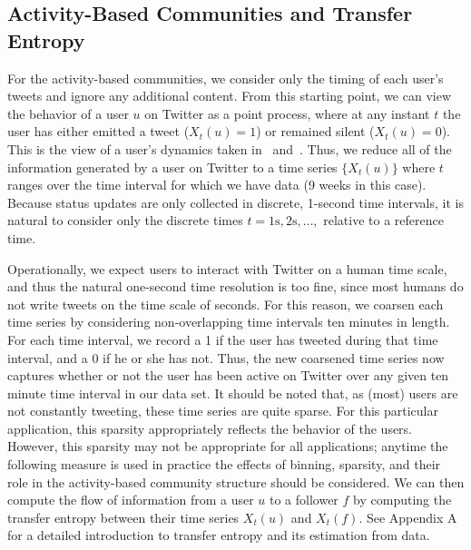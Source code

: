 \documentclass[10pt,letterpaper]{article}
\begin{document}
\subsection{Activity-Based Communities and Transfer Entropy}
\label{sec:method-activity}






For the activity-based communities, we consider only the timing of each user's tweets and ignore any additional content. From this starting point, we can view the behavior of a user $u$ on Twitter as a point process, where at any instant $t$ the user has either emitted a tweet ($X_{t}(u) = 1$) or remained silent ($X_{t}(u) = 0$). This is the view of a user's dynamics taken in~\cite{darmon2013understanding} and~\cite{ver2012information}. Thus, we reduce all of the information generated by a user on Twitter to a time series $\{ X_{t}(u)\}$ where $t$ ranges over the time interval for which we have data (9 weeks in this case). Because status updates are only collected in discrete, 1-second time intervals, it is natural to consider only the discrete times $t = 1 \text{s}, 2 \text{s}, \ldots, $ relative to a reference time. 

Operationally, we expect users to interact with Twitter on a human time scale, and thus the natural one-second time resolution is too fine, since most humans do not write tweets on the time scale of seconds. For this reason, we coarsen each time series by considering non-overlapping time intervals ten minutes in length. For each time interval, we record a 1 if the user has tweeted during that time interval, and a 0 if he or she has not. Thus, the new coarsened time series now captures whether or not the user has been active on Twitter over any given ten minute time interval in our data set. It should be noted that, as (most) users are not constantly tweeting, these time series are quite sparse. For this particular application, this sparsity appropriately reflects the behavior of the users. However, this sparsity may not be appropriate for all applications; anytime the following measure is used in practice the effects of binning, sparsity, and their role in the activity-based community structure should be considered. We can then compute the flow of information from a user  $u$ to a follower $f$ by computing the transfer entropy between their time series $X_{t}(u)$ and $X_{t}(f).$ See Appendix A for a detailed introduction to transfer entropy and its estimation from data.
\end{document}
